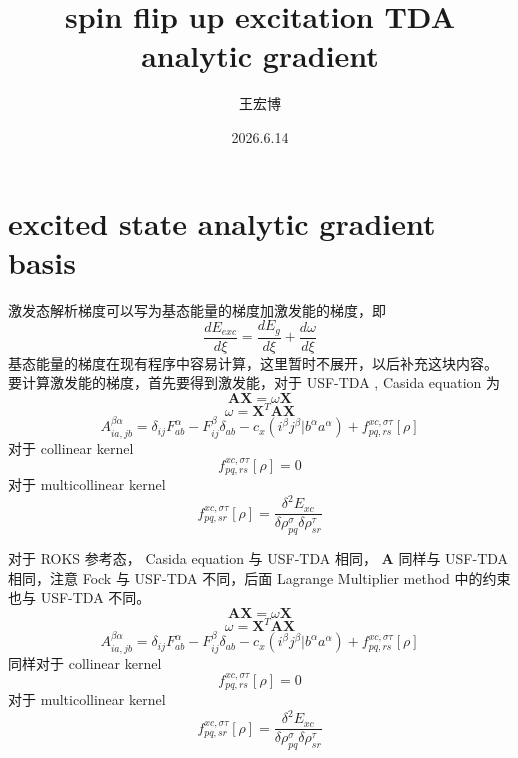 \documentclass[11pt]{ctexart}
\title{spin flip up excitation TDA analytic gradient}
\author{王宏博}
\date{2026.6.14}
\numberwithin{equation}{section}
\begin{document}
\maketitle
\vspace{-2.2em}
\section{excited state analytic gradient basis}
激发态解析梯度可以写为基态能量的梯度加激发能的梯度，即
\begin{equation}
    \frac{d E_{exc}}{d\xi} = \frac{d E_{g}}{d \xi} + \frac{d \omega}{d \xi}
\end{equation}
基态能量的梯度在现有程序中容易计算，这里暂时不展开，以后补充这块内容。
要计算激发能的梯度，首先要得到激发能，对于 USF-TDA , Casida equation 为
\begin{equation}
    \mathbf{A}\mathbf{X} = \omega \mathbf{X}
\end{equation}
\begin{equation}
    \omega = \mathbf{X}^{T} \mathbf{A} \mathbf{X}
\end{equation}
\begin{equation}
    A_{ia,jb}^{\beta\alpha} 
    = \delta_{ij}F_{ab}^{\alpha} 
    - F_{ij}^{\beta}\delta_{ab} 
    - c_x (i^{\beta}j^{\beta}|b^{\alpha}a^{\alpha})
    + f_{pq,rs}^{xc,\sigma\tau}[\rho] 
\end{equation}
对于 collinear kernel 
\begin{equation}
    f_{pq,rs}^{xc,\sigma\tau}[\rho] = 0
\end{equation}
对于 multicollinear kernel 
\begin{equation}
    f_{pq,sr}^{xc,\sigma\tau}[\rho] 
    = \frac{\delta^2 E_{xc}}{\delta\rho_{pq}^{\sigma} \delta\rho_{sr}^{\tau}}
\end{equation}

对于 ROKS 参考态， Casida equation 与 USF-TDA 相同， $\mathbf{A}$ 同样与 USF-TDA 相同，注意 Fock 与 USF-TDA 不同，后面 Lagrange Multiplier method 中的约束也与 USF-TDA 不同。
\begin{equation}
    \mathbf{A}\mathbf{X} = \omega \mathbf{X}
\end{equation}
\begin{equation}
    \omega = \mathbf{X}^{T} \mathbf{A} \mathbf{X}
\end{equation}
\begin{equation}
    A_{ia,jb}^{\beta\alpha} 
    = \delta_{ij}F_{ab}^{\alpha} 
    - F_{ij}^{\beta}\delta_{ab} 
    - c_x (i^{\beta}j^{\beta}|b^{\alpha}a^{\alpha}) 
    + f_{pq,rs}^{xc,\sigma\tau}[\rho] 
\end{equation}
同样对于 collinear kernel
\begin{equation}
    f_{pq,rs}^{xc,\sigma\tau}[\rho] = 0
\end{equation}
对于 multicollinear kernel 
\begin{equation}
    f_{pq,sr}^{xc,\sigma\tau}[\rho] 
    = \frac{\delta^2 E_{xc}}{\delta\rho_{pq}^{\sigma} \delta\rho_{sr}^{\tau}}
\end{equation}
\end{document}
